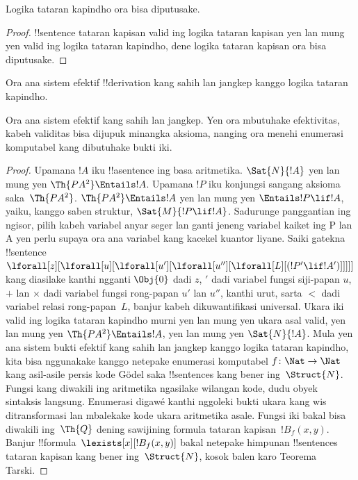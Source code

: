 \documentclass[../../../include/open-logic-section]{subfiles}
\begin{document}



\begin{thm}
Logika tataran kapindho ora bisa diputusake.
\end{thm}

\begin{proof}
!!{sentence} tataran kapisan valid ing logika tataran kapisan yen lan
mung yen valid ing logika tataran kapindho, dene logika tataran
kapisan ora bisa diputusake.
\end{proof}

\begin{thm}
Ora ana sistem efektif !!{derivation} kang sahih lan jangkep kanggo
logika tataran kapindho.
\end{thm}
Ora ana sistem efektif kang sahih lan jangkep. Yen ora mbutuhake efektivitas, kabeh validitas bisa dijupuk minangka aksioma, nanging ora menehi enumerasi komputabel kang dibutuhake bukti iki.

\begin{proof}
Upamana $!A$ iku !!a{sentence} ing basa aritmetika.
$\Sat{N}{!A}$ yen lan mung yen $\Th{PA^2} \Entails !A$.
Upamana $!P$ iku konjungsi sangang aksioma saka~$\Th{PA^2}$.
$\Th{PA^2} \Entails !A$ yen lan mung yen
$\Entails !P \lif !A$, yaiku, kanggo saben struktur,
$\Sat{M}{!P \lif !A}$. Sadurunge panggantian ing ngisor, pilih kabeh variabel anyar seger lan ganti jeneng variabel kaiket ing P lan A yen perlu supaya ora ana variabel kang kacekel kuantor liyane. Saiki gatekna !!{sentence}
$\lforall[z][\lforall[u][\lforall[u'][\lforall[u''][\lforall[L][(!P' \lif !A')]]]]]$
kang diasilake kanthi ngganti $\Obj{0}$ dadi $z$,
$\prime$ dadi variabel fungsi siji-papan $u$,
$+$ lan $\times$ dadi variabel fungsi rong-papan
$u'$ lan $u''$, kanthi urut, sarta $<$ dadi
variabel relasi rong-papan~$L$, banjur kabeh dikuwantifikasi
universal. Ukara iki valid ing logika tataran kapindho murni
yen lan mung yen ukara asal valid, yen lan mung yen
$\Th{PA^2} \Entails !A$, yen lan mung yen
$\Sat{N}{!A}$. Mula yen ana sistem bukti efektif kang sahih
lan jangkep kanggo logika tataran kapindho, kita bisa
nggunakake kanggo netepake enumerasi komputabel
$f\colon \Nat \to \Nat$ kang asil-asile persis kode Gödel saka !!{sentence}s kang
bener ing~$\Struct{N}$. Fungsi kang diwakili ing aritmetika ngasilake wilangan kode, dudu obyek sintaksis langsung. Enumerasi digawé kanthi nggoleki bukti ukara kang wis ditransformasi lan mbalekake kode ukara aritmetika asale. Fungsi iki bakal bisa
diwakili ing~$\Th{Q}$ dening sawijining
formula tataran kapisan~$!B_f(x, y)$. Banjur
!!{formula}~$\lexists[x][!B_f(x, y)]$ bakal netepake
himpunan !!{sentence}s tataran kapisan kang bener
ing~$\Struct{N}$, kosok balen karo Teorema Tarski.
\end{proof}
\end{document}
